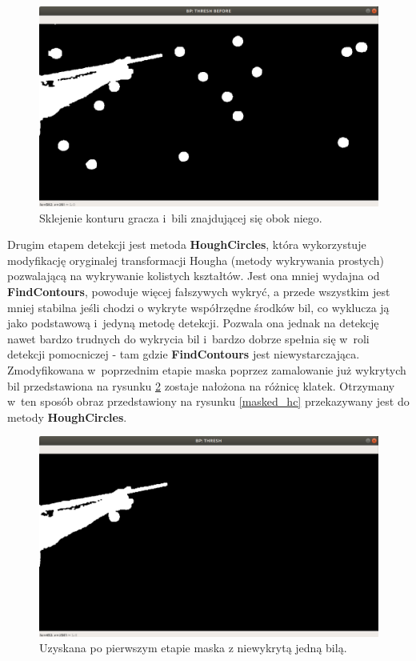 \documentclass[12pt]{article}
\begin{document}
    \begin{figure}[!htb]
        \centering
        \includegraphics[width=15cm]{./images/obrazki/bp/thresh_before_hc2.png}
        \caption{Sklejenie konturu gracza i~bili znajdującej się obok niego.}
        \label{thresh_before_hc}
    \end{figure}

    Drugim etapem detekcji jest metoda \textbf{HoughCircles}\cite{HoughCircles}, która wykorzystuje modyfikację oryginalej transformacji Hougha\cite{CirclesHoughTransform} (metody wykrywania prostych) pozwalającą na wykrywanie kolistych kształtów. Jest ona mniej wydajna od \textbf{FindContours}, powoduje więcej fałszywych wykryć, a przede wszystkim jest mniej stabilna jeśli chodzi o wykryte współrzędne środków bil, co wyklucza ją jako podstawową i~jedyną metodę detekcji. Pozwala ona jednak na detekcję nawet bardzo trudnych do wykrycia bil i~bardzo dobrze spełnia się w~roli detekcji pomocniczej - tam gdzie \textbf{FindContours} jest niewystarczająca. Zmodyfikowana w~poprzednim etapie maska poprzez zamalowanie już wykrytych bil przedstawiona na rysunku \ref{thresh_hc} zostaje nałożona na różnicę klatek. Otrzymany w~ten sposób obraz przedstawiony na rysunku \ref{masked_hc} przekazywany jest do metody \textbf{HoughCircles}.
  
    \begin{figure}[!htb]
        \centering
        \includegraphics[width=15cm]{./images/obrazki/bp/thresh_hc.png}
        \caption{Uzyskana po pierwszym etapie maska z niewykrytą jedną bilą.}
        \label{thresh_hc}
    \end{figure}
\end{document}

